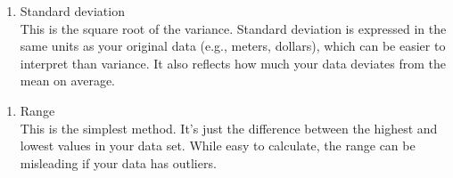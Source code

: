 \documentclass[
]{book}
\newenvironment{Shaded}{\begin{snugshade}}{\end{snugshade}}
\newcommand{\AttributeTok}[1]{\textcolor[rgb]{0.13,0.29,0.53}{#1}}
\newcommand{\CommentTok}[1]{\textcolor[rgb]{0.56,0.35,0.01}{\textit{#1}}}
\newcommand{\FunctionTok}[1]{\textcolor[rgb]{0.13,0.29,0.53}{\textbf{#1}}}
\newcommand{\NormalTok}[1]{#1}
\newcommand{\SpecialCharTok}[1]{\textcolor[rgb]{0.81,0.36,0.00}{\textbf{#1}}}
\newcommand{\StringTok}[1]{\textcolor[rgb]{0.31,0.60,0.02}{#1}}
\providecommand{\tightlist}{%
  \setlength{\itemsep}{0pt}\setlength{\parskip}{0pt}}
\begin{document}
\begin{Shaded}
\end{Shaded}

\begin{enumerate}
\def\labelenumi{\arabic{enumi}.}
\setcounter{enumi}{1}
\tightlist
\item
  Standard deviation\\
  This is the square root of the variance. Standard deviation is expressed in the same units as your original data (e.g., meters, dollars), which can be easier to interpret than variance. It also reflects how much your data deviates from the mean on average.
\end{enumerate}

\begin{Shaded}
\end{Shaded}

\begin{enumerate}
\def\labelenumi{\arabic{enumi}.}
\setcounter{enumi}{2}
\tightlist
\item
  Range\\
  This is the simplest method. It's just the difference between the highest and lowest values in your data set. While easy to calculate, the range can be misleading if your data has outliers.
\end{enumerate}

\begin{Shaded}
\end{Shaded}
\end{document}

